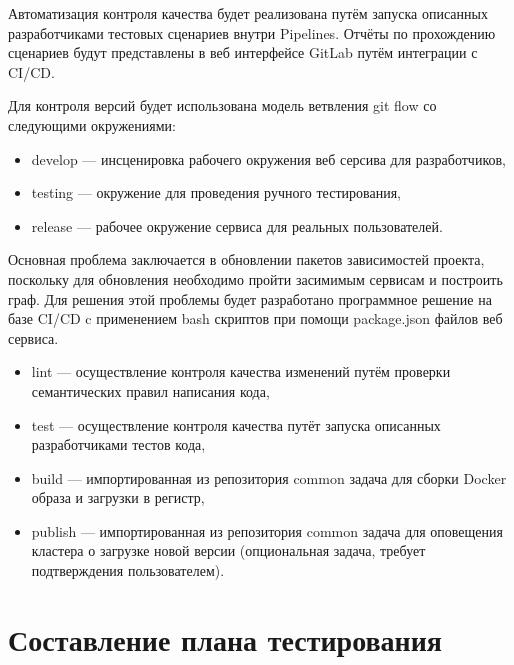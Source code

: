 Автоматизация контроля качества будет реализована путём запуска описанных разработчиками тестовых сценариев внутри Pipelines.
Отчёты по прохождению сценариев будут представлены в веб интерфейсе GitLab путём интеграции с CI/CD.

Для контроля версий будет использована модель ветвления git flow со следующими окружениями:

\begin{itemize}
    \item develop --- инсценировка рабочего окружения веб серсива для разработчиков,
    \item testing --- окружение для проведения ручного тестирования,
    \item release --- рабочее окружение сервиса для реальных пользователей.
\end{itemize}

Основная проблема заключается в обновлении пакетов зависимостей проекта, поскольку для обновления необходимо пройти засимимым сервисам и построить граф.
Для решения этой проблемы будет разработано программное решение на базе CI/CD c применением bash скриптов при помощи package.json файлов веб сервиса.

\begin{itemize}
    \item lint --- осуществление контроля качества изменений путём проверки семантических правил написания кода,
    \item test --- осуществление контроля качества путёт запуска описанных разработчиками тестов кода,
    \item build --- импортированная из репозитория common задача для сборки Docker образа и загрузки в регистр,
    \item publish --- импортированная из репозитория common задача для оповещения кластера о загрузке новой версии (опциональная задача, требует подтверждения пользователем).
\end{itemize}

\section{Составление плана тестирования}

